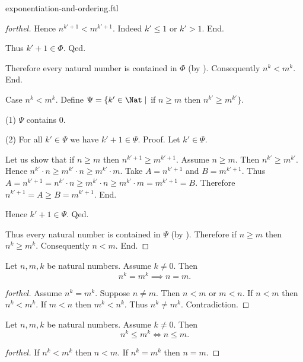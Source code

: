 \documentclass{naproche-library}
\begin{document}
\begin{smodule}{exponentiation-and-ordering.ftl}
\begin{proof}[forthel]
          Hence $n^{k' + 1} < m^{k' + 1}$.
          Indeed $k' \leq 1$ or $k' > 1$.
        End.

        Thus $k' + 1 \in \Phi$.
      Qed.

      Therefore every natural number is contained in $\Phi$ (by ).
      Consequently $n^{k} < m^{k}$.
    End.

    Case $n^{k} < m^{k}$.
      Define $\Psi = \{ k' \in \Nat \mid$ if $n \geq m$ then $n^{k'} \geq m^{k'} \}$.

      (1) $\Psi$ contains $0$.

      (2) For all $k' \in \Psi$ we have $k' + 1 \in \Psi$. \newline
      Proof.
        Let $k' \in \Psi$.

        Let us show that if $n \geq m$ then $n^{k' + 1} \geq m^{k' + 1}$.
          Assume $n \geq m$.
          Then $n^{k'} \geq m^{k'}$.
          Hence $n^{k'} \cdot n \geq m^{k'} \cdot n \geq m^{k'} \cdot m$.
          Take $A = n^{k' + 1}$ and $B = m^{k' + 1}$. %
          Thus $A
            = n^{k' + 1}
            = n^{k'} \cdot n
            \geq m^{k'} \cdot n
            \geq m^{k'} \cdot m
            = m^{k' + 1}
            = B$.
          Therefore $n^{k' + 1} = A \geq B = m^{k' + 1}$.
        End.

        Hence $k' + 1 \in \Psi$.
      Qed.

      Thus every natural number is contained in $\Psi$ (by ).
      Therefore if $n \geq m$ then $n^{k} \geq m^{k}$.
      Consequently $n < m$.
    End.
  \end{proof}

  \begin{corollary}[forthel,id=ARITHMETIC_09_2797602550579200]
    Let $n, m, k$ be natural numbers.
    Assume $k \neq 0$.
    Then \[ n^{k} = m^{k} \implies n = m. \]
  \end{corollary}
  \begin{proof}[forthel]
    Assume $n^{k} = m^{k}$.
    Suppose $n \neq m$.
    Then $n < m$ or $m < n$.
    If $n < m$ then $n^{k} < m^{k}$.
    If $m < n$ then $m^{k} < n^{k}$.
    Thus $n^{k} \neq m^{k}$.
    Contradiction.
  \end{proof}

  \begin{corollary}[forthel,id=ARITHMETIC_09_6875081963732992]
    Let $n, m, k$ be natural numbers.
    Assume $k \neq 0$.
    Then \[ n^{k} \leq m^{k} \iff n \leq m. \]
  \end{corollary}
  \begin{proof}[forthel]
    If $n^{k} < m^{k}$ then $n < m$.
    If $n^{k} = m^{k}$ then $n = m$.


\end{proof}
\end{smodule}
\end{document}
